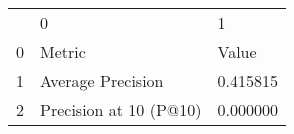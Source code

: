 \begin{tabular}{lll}
 & 0 & 1 \\
0 & Metric & Value \\
1 & Average Precision & 0.415815 \\
2 & Precision at 10 (P@10) & 0.000000 \\
\end{tabular}
